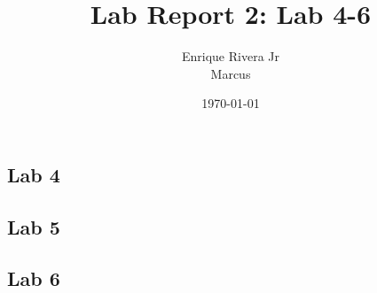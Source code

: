 \documentclass{article}
\title{Lab Report 2: Lab 4-6}
\author{Enrique Rivera Jr \\ Marcus}
\date{\today}
\begin{document}
\maketitle

\begin{center}
\section*{Lab 4}
\end{center}


\begin{center}
    \section*{Lab 5}
\end{center}



\begin{center}
    \section*{Lab 6}
\end{center}
\end{document}
